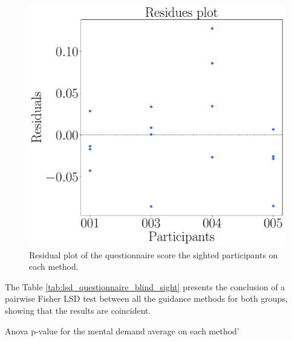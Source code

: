 \begin{figure}[!htb]
    \begin{minipage}{0.45\textwidth}
        \centering
        \includegraphics[width = \textwidth]{Resultados/Questionario/Figuras/pdf/residplot_questionnaire_sight.pdf}
        \caption{Residual plot of the questionnaire score the sighted participants on each method.}
        \label{fig:residplot_questionnaire_sight}
    \end{minipage}
\end{figure}

The Table \ref{tab:lsd_questionnaire_blind_sight} presents the conclusion of a pairwise Fisher LSD test between all the guidance methods for both groups, showing that the results are coincident.

\FloatBarrier

\begin{table}[!thb]
    \caption{Anova p-value for the mental demand average on each method'}
    \label{tab:lsd_questionnaire_blind_sight}
    \begin{minipage}{1\textwidth}
        
    \end{minipage}
    \begin{minipage}{1\textwidth}
        
    \end{minipage}
\end{table}

